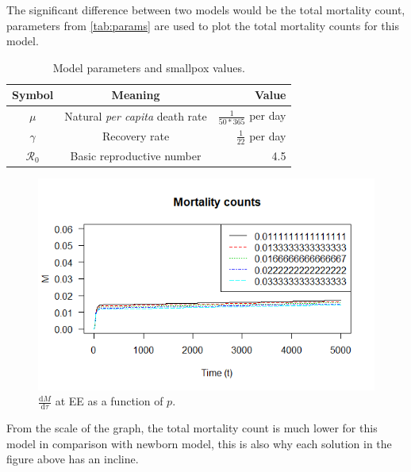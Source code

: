 \documentclass[12pt]{article}
\newcommand\dbyd[2]{\frac{\mathrm d{#1}}{\mathrm d{#2}}}
\newcommand{\R}{\mathcal{R}}
\begin{document}
The significant difference between two models would be the total mortality count, parameters from \autoref{tab:params} are used to plot the total mortality counts for this model.

\begin{table}[H]
\begin{center}
\caption{Model parameters and smallpox values.}
\label{tab:params}
\smallskip
\begin{tabular}{c|c|r}
{\bfseries Symbol} & {\bfseries Meaning} & {\bfseries Value} \\\hline
$\mu$ & Natural \emph{per capita} death rate & $\frac{1}{50*365}$ per day \\
$\gamma$ & Recovery rate & $\frac{1}{22}$ per day \\
$\R_0$ & Basic reproductive number & 4.5
\end{tabular}
\end{center}
\end{table}

\begin{figure}[H]
  \centering
  \includegraphics[width=1\textwidth]{Figures/Total_mortality_sus.png}
  \caption{$\dbyd{M}{\tau}$ at EE as a function of $p$.}
\label{fig:dMdt}
\end{figure}

From the scale of the graph, the total mortality count is much lower for this model in comparison with newborn model, this is also why each solution in the figure above has an incline.
\end{document}
